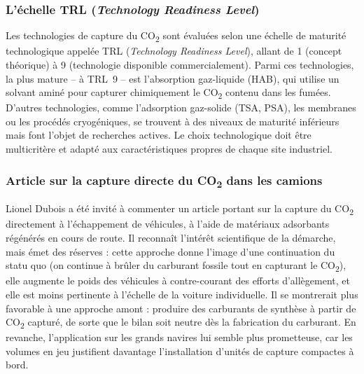 \subsubsection{L'échelle TRL (\textit{Technology Readiness Level})}
Les technologies de capture du CO\textsubscript{2} sont évaluées selon une échelle de maturité technologique appelée TRL (\textit{Technology Readiness Level}), allant de 1 (concept théorique) à 9 (technologie disponible commercialement). Parmi ces technologies, la plus mature -- à TRL~9 -- est l'absorption gaz-liquide (HAB), qui utilise un solvant aminé pour capturer chimiquement le CO\textsubscript{2} contenu dans les fumées. D'autres technologies, comme l'adsorption gaz-solide (TSA, PSA), les membranes ou les procédés cryogéniques, se trouvent à des niveaux de maturité inférieurs mais font l'objet de recherches actives. Le choix technologique doit être multicritère et adapté aux caractéristiques propres de chaque site industriel.

\subsubsection{Article sur la capture directe du CO\texorpdfstring{\textsubscript{2}}{2} dans les camions}
Lionel Dubois a été invité à commenter un article portant sur la capture du CO\textsubscript{2} directement à l'échappement de véhicules, à l'aide de matériaux adsorbants régénérés en cours de route. Il reconnaît l'intérêt scientifique de la démarche, mais émet des réserves : cette approche donne l'image d'une continuation du statu quo (on continue à brûler du carburant fossile tout en capturant le CO\textsubscript{2}), elle augmente le poids des véhicules à contre-courant des efforts d'allègement, et elle est moins pertinente à l'échelle de la voiture individuelle. Il se montrerait plus favorable à une approche amont : produire des carburants de synthèse à partir de CO\textsubscript{2} capturé, de sorte que le bilan soit neutre dès la fabrication du carburant. En revanche, l'application sur les grands navires lui semble plus prometteuse, car les volumes en jeu justifient davantage l'installation d'unités de capture compactes à bord.


